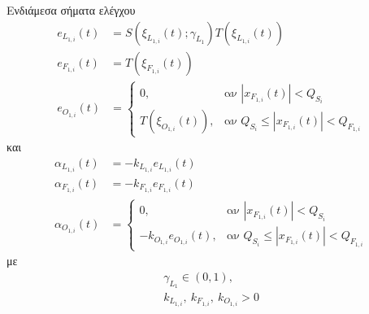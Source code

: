\begin{step}
\bigskip
Ενδιάμεσα σήματα ελέγχου
\begin{align}
  e_{L_{1,i}}(t) & = S\left( \xi_{L_{1,i}}(t); \gamma_{L_{1}} \right) T\left( \xi_{L_{1,i}}(t) \right) \label{eL1} \\[0.3cm]
  e_{F_{1,i}}(t) & = T\left( \xi_{F_{1,i}}(t) \right) \label{eF1}                                                  \\[0.3cm]
  e_{O_{1,i}}(t) & =
  \begin{cases}
    0,                                & \text{αν } | x_{F_{1,i}}(t) | < Q_{S_i}                  \\[0.3cm]
    T\left( \xi_{O_{1,i}}(t) \right), & \text{αν } Q_{S_i} \leq | x_{F_{1,i}}(t) | < Q_{F_{1,i}}
  \end{cases} \label{eO1}
\end{align}
και
\begin{align}
  \alpha_{L_{1,i}}(t) & = -k_{L_{1,i}} e_{L_{1,i}}(t) \label{alphaL1} \\[0.3cm]
  \alpha_{F_{1,i}}(t) & = -k_{F_{1,i}} e_{F_{1,i}}(t) \label{alphaF1} \\[0.3cm]
  \alpha_{O_{1,i}}(t) & =
  \begin{cases}
    0,                            & \text{αν } | x_{F_{1,i}}(t) | < Q_{S_i}                  \\[0.3cm]
    - k_{O_{1,i}} e_{O_{1,i}}(t), & \text{αν } Q_{S_i} \leq | x_{F_{1,i}}(t) | < Q_{F_{1,i}}
  \end{cases} \label{alphaO1}
\end{align}
με
\begin{gather}
  \gamma_{L_{1}} \in (0, 1), \label{gamma1} \\
  k_{L_{1,i}},\ k_{F_{1,i}},\ k_{O_{1,i}} > 0 \label{kappa1}
\end{gather}
\end{step}

